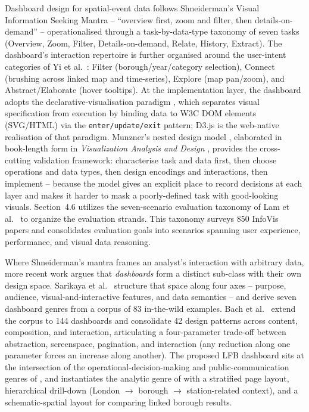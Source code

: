 Dashboard design for spatial-event data follows Shneiderman's Visual Information Seeking Mantra -- ``overview first, zoom and filter, then details-on-demand'' \cite{shneiderman1996} -- operationalised through a task-by-data-type taxonomy of seven tasks (Overview, Zoom, Filter, Details-on-demand, Relate, History, Extract). The dashboard's interaction repertoire is further organised around the user-intent categories of Yi et al.\ \cite{yi2007}: Filter (borough/year/category selection), Connect (brushing across linked map and time-series), Explore (map pan/zoom), and Abstract/Elaborate (hover tooltips). At the implementation layer, the dashboard adopts the declarative-visualisation paradigm \cite{heer2010,bostock2011}, which separates visual specification from execution by binding data to W3C DOM elements (SVG/HTML) via the \texttt{enter/update/exit} pattern; D3.js \cite{bostock2011} is the web-native realisation of that paradigm. Munzner's nested design model \cite{munzner2009}, elaborated in book-length form in \emph{Visualization Analysis and Design} \cite{munzner2014}, provides the cross-cutting validation framework: characterise task and data first, then choose operations and data types, then design encodings and interactions, then implement -- because the model gives an explicit place to record decisions at each layer and makes it harder to mask a poorly-defined task with good-looking visuals. Section~4.6 utilizes the seven-scenario evaluation taxonomy of Lam et al.\ \cite{lam2011} to organize the evaluation strands. This taxonomy surveys 850 InfoVis papers and consolidates evaluation goals into scenarios spanning user experience, performance, and visual data reasoning.

Where Shneiderman's mantra frames an analyst's interaction with arbitrary data, more recent work argues that \emph{dashboards} form a distinct sub-class with their own design space. Sarikaya et al.\ \cite{sarikaya2018} structure that space along four axes -- purpose, audience, visual-and-interactive features, and data semantics -- and derive seven dashboard genres from a corpus of 83 in-the-wild examples. Bach et al.\ \cite{bach2023patterns} extend the corpus to 144 dashboards and consolidate 42 design patterns across content, composition, and interaction, articulating a four-parameter trade-off between abstraction, screenspace, pagination, and interaction (any reduction along one parameter forces an increase along another). The proposed LFB dashboard sits at the intersection of the operational-decision-making and public-communication genres of \cite{sarikaya2018}, and instantiates the analytic genre of \cite{bach2023patterns} with a stratified page layout, hierarchical drill-down (London $\to$ borough $\to$ station-related context), and a schematic-spatial layout for comparing linked borough results.

